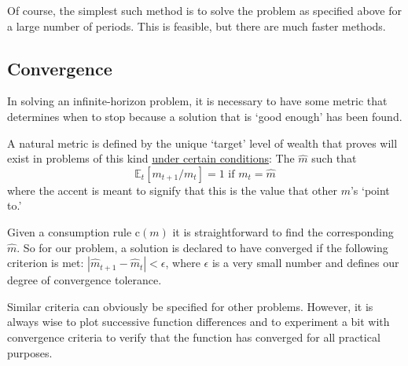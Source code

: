 \documentclass[titlepage, headings=optiontotocandhead]{Resources/texmf-local/tex/latex/econtex}
\begin{document}
Of course, the simplest such method is to solve the problem as
specified above for a large number of periods.  This is feasible, but
there are much faster methods.

\subsection{Convergence}

In solving an infinite-horizon problem, it is necessary to have some
metric that determines when to stop because a solution that is `good
enough' has been found.

A natural metric is defined by the unique `target' level of wealth that \cite{BufferStockTheory} proves
will exist in problems of this kind \href{https://llorracc.github.io/BufferStockTheory#GICNrm}{under certain conditions}: The $\hat{m}$ such that
\begin{equation}
  {\mathbb{E}}_t [{m}_{t+1}/m_t] = 1 \mbox{~if~} m_t = \hat{m}  \label{eq:mTrgNrmet}
\end{equation}
where the accent is meant to signify that this is the value
that other $m$'s `point to.'

Given a consumption rule $\mathrm{c}(m)$ it is straightforward to find
the corresponding $\hat{m}$.  So for our problem, a solution is declared
to have converged if the following criterion is met:
$\left|\hat{m}_{t+1}-\hat{m}_{t}\right| < \epsilon$, where $\epsilon$ is
a very small number and defines our degree of convergence tolerance.

Similar criteria can obviously be specified for other problems.
However, it is always wise to plot successive function differences and
to experiment a bit with convergence criteria to verify that the
function has converged for all practical purposes.
\end{document}
